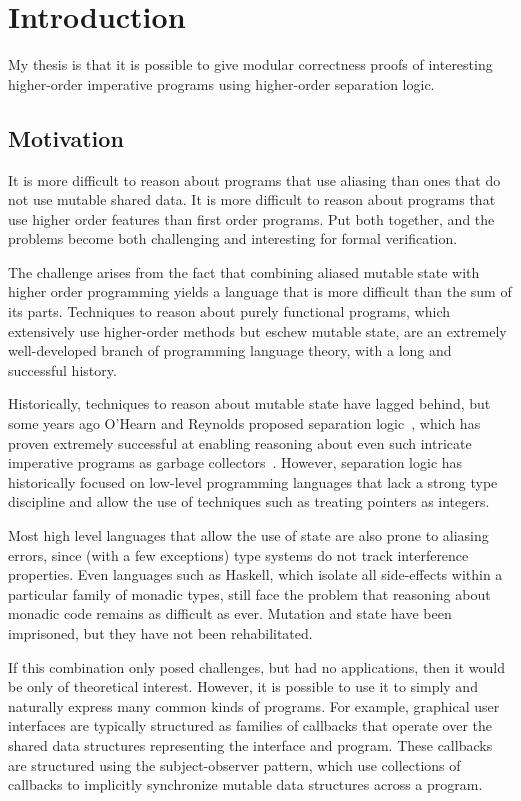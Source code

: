 \chapter{Introduction}

My thesis is that it is possible to give modular correctness proofs of
interesting higher-order imperative programs using higher-order
separation logic.

\section{Motivation}

It is more difficult to reason about programs that use aliasing than
ones that do not use mutable shared data. It is more difficult to
reason about programs that use higher order features than first order
programs. Put both together, and the problems become both challenging
and interesting for formal verification.

The challenge arises from the fact that combining aliased mutable
state with higher order programming yields a language that is more
difficult than the sum of its parts. Techniques to reason about purely
functional programs, which extensively use higher-order methods but
eschew mutable state, are an extremely well-developed branch of
programming language theory, with a long and successful history.

Historically, techniques to reason about mutable state have lagged
behind, but some years ago O'Hearn and Reynolds proposed separation
logic~\citep{sep-logic}, which has proven extremely successful at
enabling reasoning about even such intricate imperative programs as
garbage collectors~\citep{gc-proof}. However, separation logic has
historically focused on low-level programming languages that lack a
strong type discipline and allow the use of techniques such as
treating pointers as integers.

Most high level languages that allow the use of state are also prone
to aliasing errors, since (with a few exceptions) type systems do not
track interference properties. Even languages such as Haskell, which
isolate all side-effects within a particular family of monadic types,
still face the problem that reasoning about monadic code remains as
difficult as ever. Mutation and state have been imprisoned, but they
have not been rehabilitated.

If this combination only posed challenges, but had no applications,
then it would be only of theoretical interest. However, it is possible
to use it to simply and naturally express many common kinds of
programs. For example, graphical user interfaces are typically
structured as families of callbacks that operate over the shared data
structures representing the interface and program. These callbacks are
structured using the subject-observer pattern, which use collections of 
callbacks to implicitly synchronize mutable data structures across 
a program. 


